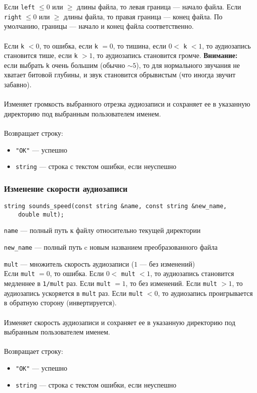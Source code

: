 \documentclass[14pt,a4paper]{article}
\begin{document}
\noindent Если \lstinline{left} $\leq 0$ или $\geq$ длины файла, то левая граница --- начало файла. Если \lstinline{right} $\leq 0$ или $\geq$ длины файла, то правая граница --- конец файла. По умолчанию, границы --- начало и конец файла соответственно. \\\\
Если \lstinline{k} $< 0$, то ошибка, если \lstinline{k} $= 0$, то тишина, если $0 <$ \lstinline{k} $< 1$, то аудиозапись становится тише, если \lstinline{k} $> 1$, то аудиозапись становится громче. \textbf{Внимание:} если выбрать \lstinline{k} очень большим (обычно $\sim 5$), то для нормального звучания не хватает битовой глубины, и звук становится обрывистым (что иногда звучит забавно).\\\\
Изменяет громкость выбранного отрезка аудиозаписи и сохраняет ее в указанную директорию под выбранным пользователем именем. \\\\
Возвращает строку:
\smallskip
\begin{itemize}
\item \lstinline{"OK"} --- успешно
\item \lstinline{string} --- строка с текстом ошибки, если неуспешно
\end{itemize}

\subsubsection*{Изменение скорости аудиозаписи}

\begin{lstlisting}
string sounds_speed(const string &name, const string &new_name, 
	double mult);
\end{lstlisting}

\lstinline{name} --- полный путь к файлу относительно текущей директории \par
\lstinline{new_name} --- полный путь c новым названием преобразованного файла \par
\lstinline{mult} --- множитель скорость аудиозаписи ($1$ --- без изменений) \\

\noindent Если \lstinline{mult} $= 0$, то ошибка. Если $0 <$ \lstinline{mult} $< 1$, то аудиозапись становится медленнее в \lstinline{1/mult} раз. Если \lstinline{mult} $= 1$, то без изменений. Если \lstinline{mult} $> 1$, то аудиозапись ускоряется в \lstinline{mult} раз. Если \lstinline{mult} $< 0$, то аудиозапись проигрывается в обратную сторону (инвертируется).\\\\
Изменяет скорость аудиозаписи и сохраняет ее в указанную директорию под выбранным пользователем именем. \\\\
Возвращает строку:
\smallskip
\begin{itemize}
\item \lstinline{"OK"} --- успешно
\item \lstinline{string} --- строка с текстом ошибки, если неуспешно
\end{itemize}
\end{document}
